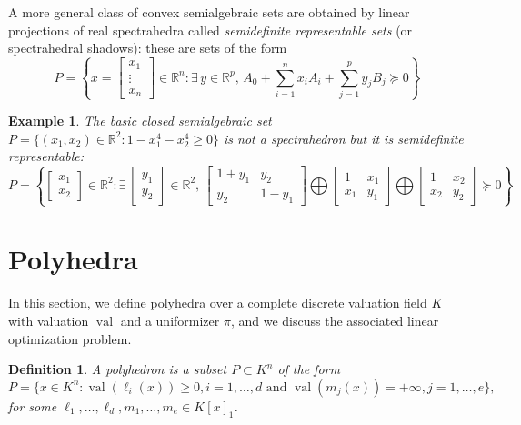 \documentclass[a4paper,12pt]{article}
\newtheorem{definition}{Definition}
\newtheorem{example}{Example}
\newcommand{\R}{\mathbb{R}} %
\DeclareMathOperator{\val}{val}
\begin{document}
A more general class of convex semialgebraic sets are obtained by linear projections of real spectrahedra
called \emph{semidefinite representable sets} (or spectrahedral shadows): these are sets of the form
$$
P = \left\{x = \left[\begin{smallmatrix} x_1 \\ \vdots \\ x_n \end{smallmatrix}\right] \in \R^n : \exists\,y\in\R^p, \, A_0 + \sum_{i=1}^n x_i A_i + \sum_{j=1}^p y_j B_j \succeq 0\right\}
$$

\begin{example}
\label{fermat_quartic}
The basic closed semialgebraic set $P = \{(x_1,x_2) \in \R^2 : 1-x_1^4-x_2^4 \geq 0\}$ is not a spectrahedron
but it is semidefinite representable:
$$
P = \left\{\begin{bmatrix} x_1 \\ x_2 \end{bmatrix} \in \R^2 :
\exists\,
\begin{bmatrix} y_1 \\ y_2 \end{bmatrix} \in \R^2, \,
\begin{bmatrix}
  1+y_1 & y_2 \\
  y_2 & 1-y_1
\end{bmatrix}
\bigoplus
\begin{bmatrix}
  1 & x_1 \\
  x_1 & y_1
\end{bmatrix}
\bigoplus
\begin{bmatrix}
  1 & x_2 \\
  x_2 & y_2
\end{bmatrix}
\succeq 0
\right\}
$$
\end{example}


\section{Polyhedra}

In this section, we define polyhedra over a complete discrete valuation field $K$ with valuation $\val$ and a uniformizer $\pi$, and we discuss the associated linear optimization problem.

\begin{definition}
  \label{def_polyhedra}
  A \emph{polyhedron} is a subset $P \subset K^n$ of the form
  $$
  P = \{x \in K^n : \val(\ell_i(x)) \geq 0, i=1,\ldots,d \text{ and }
  \val(m_j(x)) = +\infty, j=1,\ldots,e\},
  $$
  for some $\ell_1,\ldots,\ell_d,m_1,\ldots,m_e \in K[x]_1$.
\end{definition}
\end{document}

